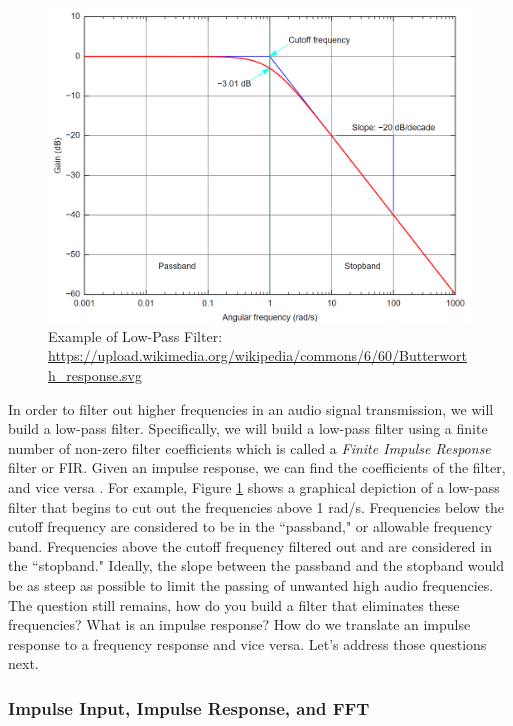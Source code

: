\begin{figure}[h!]
	\centering
	\includegraphics[scale = .5]{low_pass.png} %
	\caption{Example of Low-Pass Filter: \url{https://upload.wikimedia.org/wikipedia/commons/6/60/Butterworth_response.svg}}
	\label{fig:lowpass}
\end{figure}    

In order to filter out higher frequencies in an audio signal transmission, we will build a low-pass filter.  Specifically, we will build a low-pass filter using a finite number of non-zero filter coefficients which is called a \textit{Finite Impulse Response} filter or FIR.  Given an impulse response, we can find the coefficients of the filter, and vice versa \cite{notes:class}.  For example, Figure \ref{fig:lowpass} shows a graphical depiction of a low-pass filter that begins to cut out the frequencies above 1 rad/s.  Frequencies below the cutoff frequency are considered to be in the ``passband," or allowable frequency band.  Frequencies above the cutoff frequency filtered out and are considered in the ``stopband."  Ideally, the slope between the passband and the stopband would be as steep as possible to limit the passing of unwanted high audio frequencies.  The question still remains, how do you build a filter that eliminates these frequencies?  What is an impulse response?  How do we translate an impulse response to a frequency response and vice versa.  Let's address those questions next. 

\subsubsection{Impulse Input, Impulse Response, and FFT}

